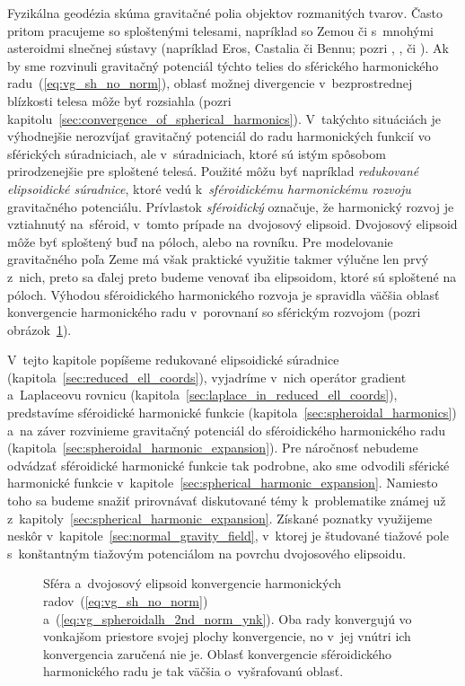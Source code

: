 \documentclass[a4paper, 12pt]{book}
\begin{document}
Fyzikálna geodézia skúma gravitačné polia objektov rozmanitých tvarov.  Často 
pritom pracujeme so sploštenými telesami, napríklad so Zemou či s~mnohými 
asteroidmi slnečnej sústavy (napríklad Eros, Castalia či Bennu; pozri 
\cite{Garmier2001}, \cite{Hu2015}, \cite{Sebera2016} či \cite{Reimond2016}).  
Ak by sme rozvinuli gravitačný potenciál týchto telies do sférického 
harmonického radu~(\ref{eq:vg_sh_no_norm}), oblasť možnej divergencie 
v~bezprostrednej blízkosti telesa môže byť rozsiahla (pozri 
kapitolu~\ref{sec:convergence_of_spherical_harmonics}).  V~takýchto situáciách 
je výhodnejšie nerozvíjať gravitačný potenciál do radu harmonických funkcií vo 
sférických súradniciach, ale v~súradniciach, ktoré sú istým spôsobom 
prirodzenejšie pre sploštené telesá.  Použité môžu byť napríklad 
\emph{redukované elipsoidické súradnice}, ktoré vedú k~\emph{sféroidickému 
harmonickému rozvoju} gravitačného potenciálu.  Prívlastok \emph{sféroidický} 
označuje, že harmonický rozvoj je vztiahnutý na~sféroid, v~tomto prípade 
na~dvojosový elipsoid.  Dvojosový elipsoid môže byť sploštený buď na póloch, 
alebo na rovníku.  Pre modelovanie gravitačného poľa Zeme má však praktické 
využitie takmer výlučne len prvý z~nich, preto sa ďalej preto budeme venovať 
iba elipsoidom, ktoré sú sploštené na póloch.  Výhodou sféroidického 
harmonického rozvoja je spravidla väčšia oblasť konvergencie harmonického radu 
v~porovnaní so sférickým rozvojom (pozri 
obrázok~\ref{fig:spheroidal_harmonics_convergence}).

V~tejto kapitole popíšeme redukované elipsoidické súradnice 
(kapitola~\ref{sec:reduced_ell_coords}), vyjadríme v~nich operátor gradient 
a~Laplaceovu rovnicu (kapitola~\ref{sec:laplace_in_reduced_ell_coords}), 
predstavíme sféroidické harmonické funkcie 
(kapitola~\ref{sec:spheroidal_harmonics}) a~na záver rozvinieme gravitačný 
potenciál do sféroidického harmonického radu 
(kapitola~\ref{sec:spheroidal_harmonic_expansion}).  Pre náročnosť nebudeme 
odvádzať sféroidické harmonické funkcie tak podrobne, ako sme odvodili sférické 
harmonické funkcie v~kapitole~\ref{sec:spherical_harmonic_expansion}.  Namiesto 
toho sa budeme snažiť prirovnávať diskutované témy k~problematike známej už 
z~kapitoly~\ref{sec:spherical_harmonic_expansion}.  Získané poznatky využijeme 
neskôr v~kapitole~\ref{sec:normal_gravity_field}, v~ktorej je študované tiažové 
pole s~konštantným tiažovým potenciálom na povrchu dvojosového elipsoidu.

\begin{figure}
\centering

\caption{Sféra a~dvojosový elipsoid konvergencie harmonických 
radov~(\ref{eq:vg_sh_no_norm}) a~(\ref{eq:vg_spheroidalh_2nd_norm_ynk}).  Oba 
rady konvergujú vo vonkajšom priestore svojej plochy konvergencie, no v~jej 
vnútri ich konvergencia zaručená nie je.  Oblasť konvergencie sféroidického 
harmonického radu je tak väčšia o~vyšrafovanú oblasť.}
\label{fig:spheroidal_harmonics_convergence}
\end{figure}
\end{document}
